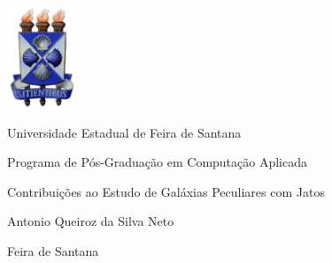 \begin{titlepage}
\begin{center}


\includegraphics[width=20mm]{cover/logoUEFS} \\

\large

Universidade Estadual de Feira de Santana

Programa de Pós-Graduação em Computação Aplicada

\vspace{7cm}

\huge{Contribuições ao Estudo de Galáxias
Peculiares com Jatos}

\vspace{.5cm}

\Large{Antonio Queiroz da Silva Neto}

\vfill

\large
Feira de Santana

\the\year

\end{center}
\end{titlepage}



